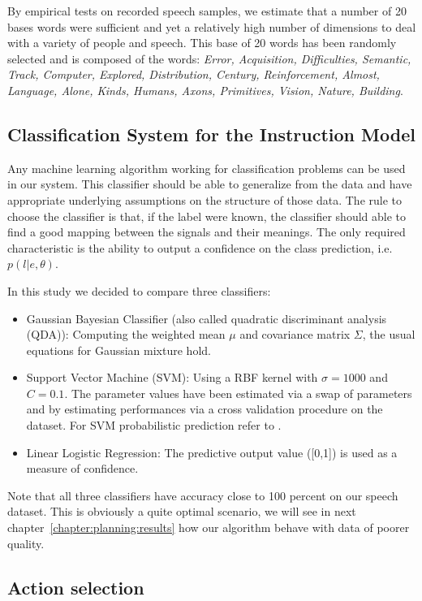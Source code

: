 By empirical tests on recorded speech samples, we estimate that a number of 20 bases words were sufficient and yet a relatively high number of dimensions to deal with a variety of people and speech. This base of 20 words has been randomly selected and is composed of the words:\emph{ \footnotesize{Error, Acquisition, Difficulties, Semantic, Track, Computer, Explored, Distribution, Century, Reinforcement, Almost, Language, Alone, Kinds, Humans, Axons, Primitives, Vision, Nature, Building}}.

\subsection{Classification System for the Instruction Model}

Any machine learning algorithm working for classification problems can be used in our system. This classifier should be able to generalize from the data and have appropriate underlying assumptions on the structure of those data. The rule to choose the classifier is that, if the label were known, the classifier should able to find a good mapping between the signals and their meanings. The only required characteristic is the ability to output a confidence on the class prediction, i.e. $p(l|e, \theta)$.

In this study we decided to compare three classifiers:
\begin{itemize}
\item Gaussian Bayesian Classifier (also called quadratic discriminant analysis (QDA)): Computing the weighted mean $\mu$ and covariance matrix $\Sigma$, the usual equations for Gaussian mixture hold.
\item Support Vector Machine (SVM): Using a RBF kernel with $\sigma = 1000$ and $C = 0.1$. The parameter values have been estimated via a swap of parameters and by estimating performances via a cross validation procedure on the dataset. For SVM probabilistic prediction refer to \cite{platt1999probabilistic}.
\item Linear Logistic Regression: The predictive output value ([0,1]) is used as a measure of confidence.
\end{itemize}

Note that all three classifiers have accuracy close to 100 percent on our speech dataset. This is obviously a quite optimal scenario, we will see in next chapter~\ref{chapter:planning:results} how our algorithm behave with data of poorer quality.

\subsection{Action selection}

